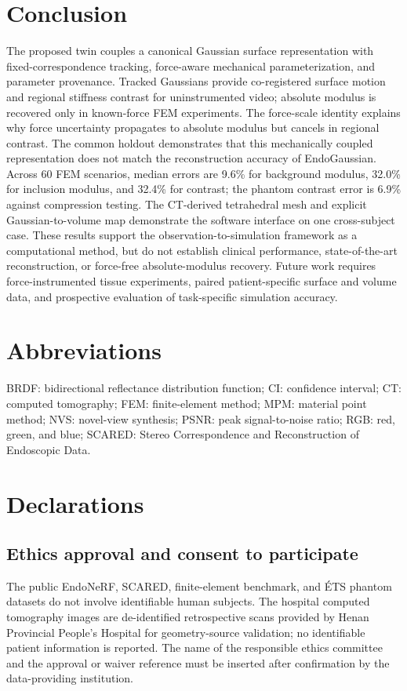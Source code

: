 \documentclass[pdflatex,lineno,referee,sn-vancouver,Numbered]{sn-jnl}
\begin{document}
\section{Conclusion}
\label{sec:conclusion}
The proposed twin couples a canonical Gaussian surface representation with
fixed-correspondence tracking, force-aware mechanical parameterization, and
parameter provenance. Tracked Gaussians provide co-registered surface
motion and regional stiffness contrast for uninstrumented video; absolute
modulus is recovered only in known-force FEM experiments. The force-scale
identity explains why force uncertainty propagates to absolute modulus but
cancels in regional contrast. The common holdout demonstrates that this
mechanically coupled representation does not match the reconstruction
accuracy of EndoGaussian. Across 60 FEM scenarios, median errors are 9.6\%
for background modulus, 32.0\% for inclusion modulus, and 32.4\% for
contrast; the phantom contrast error is 6.9\% against compression testing.
The CT-derived tetrahedral mesh and explicit Gaussian-to-volume map
demonstrate the software interface on one cross-subject case. These
results support the observation-to-simulation framework as a computational
method, but do not establish clinical performance, state-of-the-art
reconstruction, or force-free absolute-modulus recovery. Future work
requires force-instrumented tissue experiments, paired patient-specific
surface and volume data, and prospective evaluation of task-specific
simulation accuracy.



\section*{Abbreviations}
BRDF: bidirectional reflectance distribution function; CI: confidence
interval; CT: computed tomography; FEM: finite-element method; MPM:
material point method; NVS: novel-view synthesis; PSNR: peak
signal-to-noise ratio; RGB: red, green, and blue; SCARED: Stereo
Correspondence and Reconstruction of Endoscopic Data.

\section*{Declarations}

\subsection*{Ethics approval and consent to participate}
The public EndoNeRF, SCARED, finite-element benchmark, and \'ETS phantom
datasets do not involve identifiable human subjects. The hospital computed
tomography images are de-identified retrospective scans provided by Henan
Provincial People's Hospital for geometry-source validation; no
identifiable patient information is reported. The name of the responsible
ethics committee and the approval or waiver reference must be inserted
after confirmation by the data-providing institution.
\end{document}
